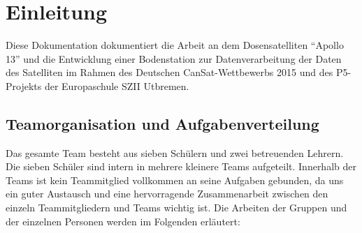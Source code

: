 \section{Einleitung}

Diese Dokumentation dokumentiert die Arbeit an dem Dosensatelliten ``Apollo 13'' und die Entwicklung einer Bodenstation zur Datenverarbeitung der Daten des Satelliten im Rahmen des Deutschen CanSat-Wettbewerbs 2015 und des P5-Projekts der Europaschule SZII Utbremen.

\subsection{Teamorganisation und Aufgabenverteilung }

Das gesamte Team besteht aus sieben Schülern und zwei betreuenden Lehrern. Die sieben Schüler sind intern in mehrere kleinere Teams aufgeteilt. Innerhalb der Teams ist kein Teammitglied vollkommen an seine Aufgaben gebunden, da uns ein guter Austausch und eine hervorragende Zusammenarbeit zwischen den einzeln Teammitgliedern und Teams wichtig ist. Die Arbeiten der Gruppen und der einzelnen Personen werden im Folgenden erläutert:

